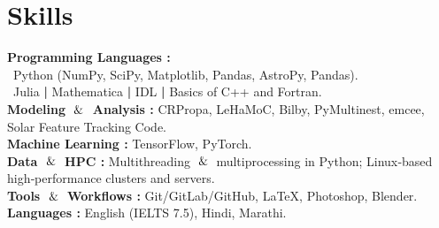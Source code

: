 \section{Skills}

        

        
        \vspace{0.10 cm}
        \begin{onecolentry}
            \textbf{Programming Languages :} \\
            \hspace{0.1 cm} \textbullet\  Python (NumPy, SciPy, Matplotlib, Pandas, AstroPy, Pandas).\\
            \hspace{0.1 cm} \textbullet\ Julia \textbf{|} Mathematica \textbf{|} IDL \textbf{|} Basics of C++ and Fortran.\\
            
            \textbf{Modeling $\And$ Analysis :} CRPropa, LeHaMoC, Bilby, PyMultinest, emcee, Solar Feature Tracking Code. \\
            \textbf{Machine Learning :} TensorFlow, PyTorch.\\
            \textbf{Data $\And$ HPC :} Multithreading $\And$ multiprocessing in Python; Linux‑based high‑performance clusters and servers.\\
            \textbf{Tools $\And$ Workflows :} Git/GitLab/GitHub, LaTeX, Photoshop, Blender.\\
            \textbf{Languages :} English (IELTS 7.5), Hindi, Marathi.
            
        \end{onecolentry}

